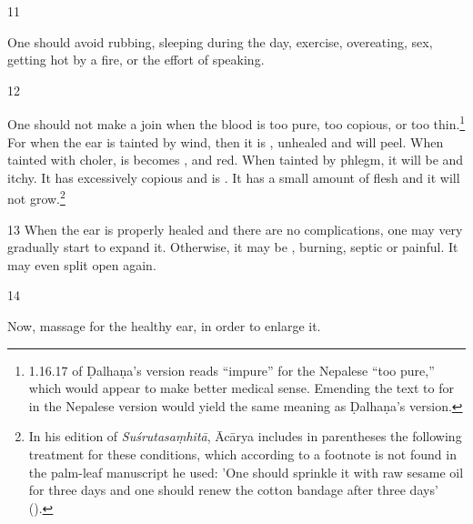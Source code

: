 \begin{translation}
    \smallskip
\item[11]
\begin{em}
        One should avoid rubbing, sleeping during the day, exercise, overeating,
        sex, getting hot by a fire, or the effort of speaking.
    \end{em}
\smallskip

\item[12]
    
One should not make a join when the blood is too pure, too copious, or too
thin.\footnote{1.16.17 of Ḍalhaṇa's version \citep[79]{vulgate} reads “impure”
    for the Nepalese “too pure,” which would appear to make better medical sense.
    Emending the text to  for  in the Nepalese
    version would yield the same meaning as Ḍalhaṇa's version.} For when the
    ear is tainted by wind, then it is , unhealed and will peel. When tainted with choler, is becomes
    ,  and red.  When tainted by
    phlegm, it will be  and itchy.  It has excessively
    copious  and is .  It
    has a small amount of  flesh and it will not
    grow.\footnote{In his edition of \emph{Suśrutasaṃhitā}, Ācārya \citep[79 n.
        1]{vulgate} includes in parentheses the following treatment for these
        conditions, which according to a footnote is not found in the palm-leaf
        manuscript he used: 'One should sprinkle it with raw sesame oil for three days
        and one should renew the cotton bandage after three days' ().}
    
\item[13] When the ear is properly healed and there are no complications,  one may
very gradually start to expand it.  Otherwise, it may be ,
burning, septic or painful.  It may even split open again.
    
\item [14]
    
Now, massage for the healthy ear, in order to enlarge it.
     

\end{translation}

